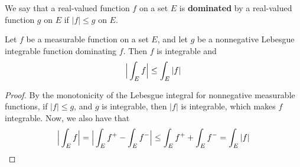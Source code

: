 \begin{definition}
    We say that a real-valued function $f$ on a set  $E$ is  \textbf{dominated}
    by a real-valued function $g$ on  $E$ if $|f| \leq g$ on $E$.
\end{definition}

\begin{theorem}\label{10.3.4}
    Let $f$ be a measurable function on a set $E$, and let  $g$ be a nonnegative
    Lebesgue integrable function dominating  $f$. Then  $f$ is integrable and
    \begin{equation*}
        \Big{|} \int_E{f} \Big{|} \leq \int_E{|f|}
    \end{equation*}
\end{theorem}
\begin{proof}
    By the monotonicity of the Lebesgue integral for nonnegative measurable
    functions, if $|f| \leq g$, and  $g$ is integrable, then  $|f|$ is
    integrable, which makes  $f$ integrable. Now, we also have that
    \begin{equation*}
        \Big{|} \int_E{f} \Big{|}=
        \Big{|} \int_E{f^+}-\int_E{f^-} \Big{|} \leq
        \int_E{f^+}+\int_E{f^-}=\int_E{|f|}
    \end{equation*}
\end{proof}


